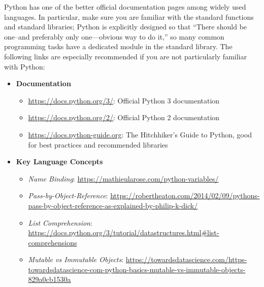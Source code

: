 \documentclass[12pt]{article}
\begin{document}
Python has one of the better official documentation pages among widely used languages.
In particular, make sure you are familiar with the standard functions and standard libraries; Python is explicitly designed so that ``There should be one--and preferably only one---obvious way to do it,'' so many common programming tasks have a dedicated module in the standard library.
The following links are especially recommended if you are not particularly familiar with Python:
\begin{itemize}
    \item \textbf{Documentation}
        \begin{itemize}
            \item \url{https://docs.python.org/3/}: Official Python 3 documentation
            \item \url{https://docs.python.org/2/}: Official Python 2 documentation
            \item \url{https://docs.python-guide.org}: The Hitchhiker's Guide to Python, good for best practices and recommended libraries
        \end{itemize}
    \item \textbf{Key Language Concepts}
        \begin{itemize}
            \item \textit{Name Binding}: \url{https://mathieularose.com/python-variables/}
            \item \textit{Pass-by-Object-Reference}: \url{https://robertheaton.com/2014/02/09/pythons-pass-by-object-reference-as-explained-by-philip-k-dick/}
            \item \textit{List Comprehension}: \url{https://docs.python.org/3/tutorial/datastructures.html#list-comprehensions}
            \item \textit{Mutable vs Immutable Objects}: \url{https://towardsdatascience.com/https-towardsdatascience-com-python-basics-mutable-vs-immutable-objects-829a0cb1530a}
        \end{itemize}
\end{itemize}
\end{document}
